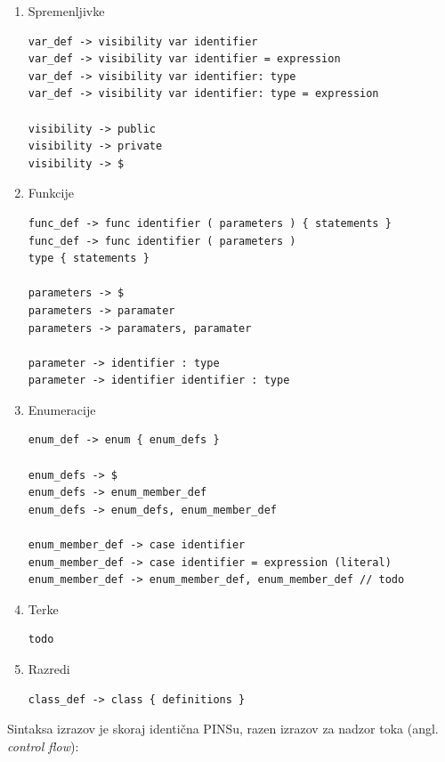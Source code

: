 \documentclass[a4paper, 12p]{book}
\begin{document}
\begin{enumerate}
	\item Spremenljivke
\begin{lstlisting}[]
var_def -> visibility var identifier 
var_def -> visibility var identifier = expression
var_def -> visibility var identifier: type 
var_def -> visibility var identifier: type = expression 

visibility -> public
visibility -> private
visibility -> $
\end{lstlisting}
	\item Funkcije
\begin{lstlisting}[]
func_def -> func identifier ( parameters ) { statements }
func_def -> func identifier ( parameters ) 
type { statements }

parameters -> $
parameters -> paramater
parameters -> paramaters, paramater

parameter -> identifier : type
parameter -> identifier identifier : type
\end{lstlisting}	
	\item Enumeracije
	
\begin{lstlisting}
enum_def -> enum { enum_defs }

enum_defs -> $
enum_defs -> enum_member_def
enum_defs -> enum_defs, enum_member_def

enum_member_def -> case identifier
enum_member_def -> case identifier = expression (literal)
enum_member_def -> enum_member_def, enum_member_def // todo
\end{lstlisting}
	\item Terke
\begin{lstlisting}
todo
\end{lstlisting}
	\item Razredi
\begin{lstlisting}
class_def -> class { definitions }
\end{lstlisting}

\end{enumerate} 

Sintaksa izrazov je skoraj identična PINSu, razen izrazov za nadzor toka (angl. \textit{control flow}):
\end{document}
